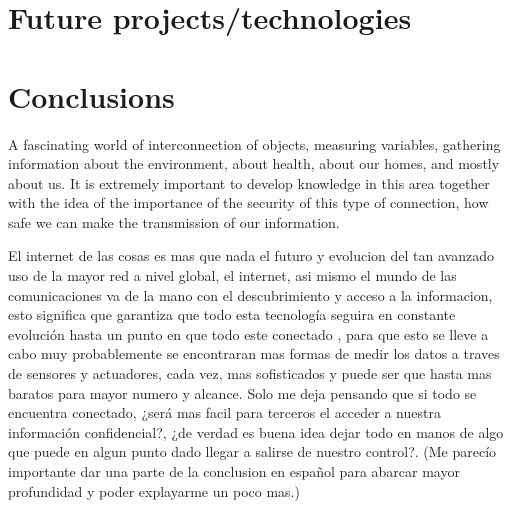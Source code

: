 \documentclass{IEEEtran}
\begin{document}
\section{Future
projects/technologies}

\section{Conclusions}

A fascinating world of interconnection of objects, measuring variables, gathering information about the environment, about health, about our homes, and mostly about us.
It is extremely important to develop knowledge in this area together with the idea of the importance of the security of this type of connection, how safe we can make the transmission of our information.

El internet de las cosas es mas que nada el futuro y evolucion del tan avanzado uso de la mayor red a nivel global, el internet, asi mismo el mundo de las comunicaciones
va de la mano con el descubrimiento y acceso a la informacion, esto significa que garantiza que todo esta tecnología seguira en constante evolución hasta un punto en que todo este conectado 
, para que esto se lleve a cabo muy probablemente se encontraran mas formas de medir los datos a traves de sensores y actuadores, cada vez, mas sofisticados y puede ser 
que hasta mas baratos para mayor numero y alcance. Solo me deja pensando que si todo se encuentra conectado, ¿será mas facil para terceros el acceder a nuestra información 
confidencial?, ¿de verdad es buena idea dejar todo en manos de algo que puede en algun punto dado llegar a salirse de nuestro control?. 
(Me parecío importante dar una parte de la conclusion en español para abarcar mayor profundidad y poder explayarme un poco mas.)





\end{document}

